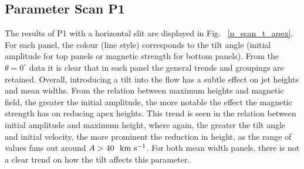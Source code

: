 %
\subsection{Parameter Scan P1}
\label{subsec:pscansII_I}
The results of P1 with a horizontal slit are displayed in Fig. ~\ref{p_scan_t_apex}. For each panel, the colour (line style) corresponds to the tilt angle (initial amplitude for top panels or magnetic strength for bottom panels). From the $\theta=0^{\circ}$ data it is clear that in each panel the general trends and groupings are retained. Overall, introducing a tilt into the flow has a subtle effect on jet heights and mean widths. From the relation between maximum heights and magnetic field, the greater the initial amplitude, the more notable the effect the magnetic strength has on reducing apex heights. This trend is seen in the relation between initial amplitude and maximum height, where again, the greater the tilt angle and initial velocity, the more prominent the reduction in height, as the range of values fans out around $A>40~~\rm{km ~s^{-1}}$. For both mean width panels, there is not a clear trend on how the tilt affects this parameter. \np
%

